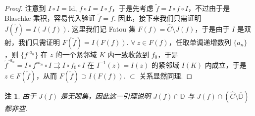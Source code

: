 \documentclass[11pt, a4paper, oneside]{ctexart}
\newtheorem{remark}[theorem]{注}
\newcommand{\D}{\mathbb{D}}
\newcommand{\Id}{\mathrm{Id}}
\begin{document}
    \begin{proof}
        注意到 $I\circ I=\Id$, $f\circ I=I\circ f$，于是先考虑 $\tilde{f}=I\circ f\circ I$，不过由于是 Blaschke 乘积，容易代入验证 $\tilde{f}=f$. 因此，接下来我们只需证明 $J(\tilde{f})=I(J(f))$. 这里我们记 Fatou 集 $F(f)=\hat{C}\setminus J(f)$，于是由于 $I$ 是双射，我们只需证明 $F(\tilde{f})=I(F(f))$. $\forall\ z\in F(f)$，任取单调递增数列 $\{a_n\}$，则 $\{f^{\circ a_n}\}$ 在 $z$ 的一个紧邻域 $K$ 内一致收敛到 $f_0$，于是 $\tilde{f}^{\circ a_n}=I\circ f^{\circ a_n}\circ I\rightrightarrows I\circ f_0\circ I$ 在 $I^{-1}(z)=I(z)$ 的紧邻域 $I(K)$ 内成立，于是 $z\in F(\tilde{f})$，从而 $F(\tilde{f})\supset I(F(f))$. $\subset$ 关系显然同理.
    \end{proof}
    \begin{remark}\label{注2.11}
        由于 $J(f)$ 是无限集，因此这一引理说明 $J(f)\cap \D$ 与 $J(f)\cap (\hat{C}\setminus \overline{\D})$ 都非空.
    \end{remark}
\end{document}
